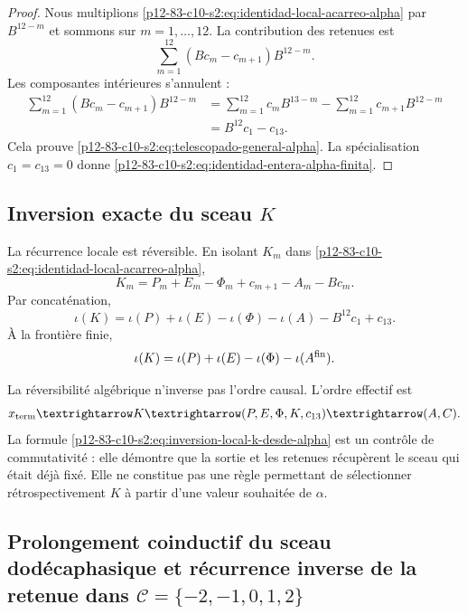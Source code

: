 \begin{proof}
Nous multiplions \eqref{p12-83-c10-s2:eq:identidad-local-acarreo-alpha} par
\(B^{12-m}\) et sommons sur \(m=1,\ldots,12\). La contribution des
retenues est
\[
 \sum_{m=1}^{12}
 (Bc_m-c_{m+1})B^{12-m}.
\]
Les composantes intérieures s’annulent :
\begin{align*}
 \sum_{m=1}^{12}(Bc_m-c_{m+1})B^{12-m}
 &=\sum_{m=1}^{12}c_mB^{13-m}
   -\sum_{m=1}^{12}c_{m+1}B^{12-m}\\
 &=B^{12}c_1-c_{13}.
\end{align*}
Cela prouve \eqref{p12-83-c10-s2:eq:telescopado-general-alpha}. La spécialisation
\(c_1=c_{13}=0\) donne \eqref{p12-83-c10-s2:eq:identidad-entera-alpha-finita}.
\end{proof}

\subsection{Inversion exacte du sceau \texorpdfstring{\(K\)}{K}}

La récurrence locale est réversible. En isolant \(K_m\) dans
\eqref{p12-83-c10-s2:eq:identidad-local-acarreo-alpha},
\begin{equation}
 \boxed{
 K_m=P_m+E_m-\Phi_m+c_{m+1}-A_m-Bc_m.}
 \label{p12-83-c10-s2:eq:inversion-local-k-desde-alpha}
\end{equation}
Par concaténation,
\begin{equation}
 \boxed{
 \iota(K)
 =\iota(P)+\iota(E)-\iota(\Phi)-\iota(A)
  -B^{12}c_1+c_{13}.}
 \label{p12-83-c10-s2:eq:inversion-concatenada-k-desde-alpha}
\end{equation}
À la frontière finie,
\[
 \iota(K)
 =\iota(P)+\iota(E)-\iota(\Phi)-\iota(A^{\rm fin}).
\]

La réversibilité algébrique n’inverse pas l’ordre causal. L’ordre effectif
est
\[
 x_{\rm term}
 \longrightarrow K
 \longrightarrow(P,E,\Phi,K,c_{13})
 \longrightarrow(A,C).
\]
La formule \eqref{p12-83-c10-s2:eq:inversion-local-k-desde-alpha} est un contrôle de
commutativité : elle démontre que la sortie et les retenues récupèrent le sceau
qui était déjà fixé. Elle ne constitue pas une règle permettant de sélectionner
rétrospectivement \(K\) à partir d’une valeur souhaitée de \(\alpha\).

\subsection{Prolongement coinductif du sceau dodécaphasique et récurrence inverse de la retenue dans \(\mathcal C=\{-2,-1,0,1,2\}\)}

